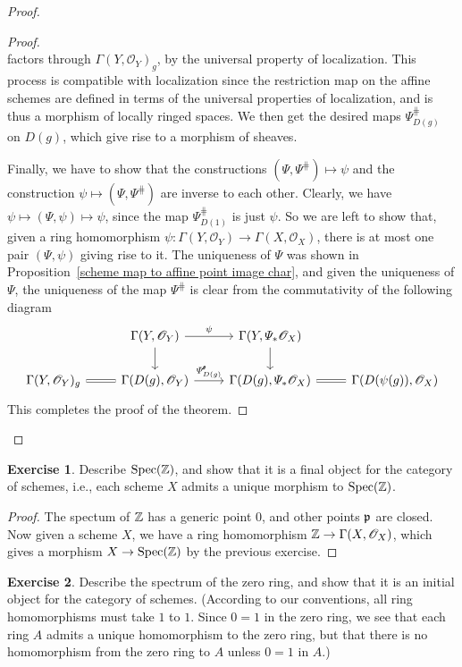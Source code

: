 \documentclass[11pt]{book}
\theoremstyle{definition}
\newtheorem{exercise}{Exercise}[section]
\begin{document}
\begin{proof}
\begin{proof}
\[\]
factors through $\Gamma(Y,\mathscr{O}_Y)_g$, by the universal property of localization. This process is compatible with localization since the restriction map on the affine schemes are defined in terms of the universal properties of localization, and is thus a morphism of locally ringed spaces. We then get the desired maps $\varPsi^{\hash}_{D(g)}$ on $D(g)$, which give rise to a morphism of sheaves.\par
Finally, we have to show that the constructions $(\varPsi,\varPsi^{\hash})\mapsto\psi$ and the construction $\psi\mapsto(\varPsi,\varPsi^{\hash})$ are inverse to each other. Clearly, we have $\psi\mapsto(\varPsi,\psi)\mapsto\psi$, since the map $\varPsi^{\hash}_{D(1)}$ is just $\psi$. So we are left to show that, given a ring homomorphism $\psi:\Gamma(Y,\mathscr{O}_Y)\to\Gamma(X,\mathscr{O}_X)$, there is at most one pair $(\varPsi,\psi)$ giving rise to it. The uniqueness of $\varPsi$ was shown in Proposition~\ref{scheme map to affine point image char}, and given the uniqueness of $\varPsi$, the uniqueness of the map $\varPsi^{\hash}$ is clear from the commutativity of the following diagram
\[\begin{tikzcd}
&\Gamma(Y,\mathscr{O}_Y)\ar[d]\ar[r,"\psi"]&\Gamma(Y,\varPsi_*\mathscr{O}_X)\ar[d]&\\
\Gamma(Y,\mathscr{O}_Y)_g\ar[r,equal]&\Gamma(D(g),\mathscr{O}_Y)\ar[r,"\varPsi^{\hash}_{D(g)}"]&\Gamma(D(g),\varPsi_*\mathscr{O}_X)\ar[r,equal]&\Gamma(D(\psi(g)),\mathscr{O}_X)
\end{tikzcd}\]
This completes the proof of the theorem.
\end{proof}
\end{proof}
\begin{exercise}
Describe $\mathrm{Spec}(\mathbb{Z})$, and show that it is a final object for the category of schemes, i.e., each scheme $X$ admits a unique morphism to $\mathrm{Spec}(\mathbb{Z})$.
\end{exercise}
\begin{proof}
The spectum of $\mathbb{Z}$ has a generic point $0$, and other points $\mathfrak{p}$ are closed. Now given a scheme $X$, we have a ring homomorphism $\mathbb{Z}\to\Gamma(X,\mathscr{O}_X)$, which gives a morphism $X\to\mathrm{Spec}(\mathbb{Z})$ by the previous exercise.
\end{proof}
\begin{exercise}
Describe the spectrum of the zero ring, and show that it is an initial object for the category of schemes. (According to our conventions, all ring homomorphisms must take $1$ to $1$. Since $0=1$ in the zero ring, we see that each ring $A$ admits a unique homomorphism to the zero ring, but that there is no homomorphism from the zero ring to $A$ unless $0=1$ in $A$.)
\end{exercise}
\end{document}
